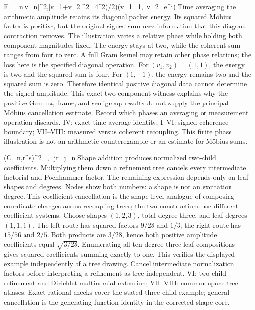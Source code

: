 {E=\sum_n|v_n|^2,\qquad |v_1+v_2|^2=4\cos^2(\theta/2)\quad(v_1=1,\ v_2=e^{i\theta})}
{Time averaging the arithmetic amplitude retains its diagonal packet energy. Its squared M\"obius factor is positive, but the original signed sum uses information that this diagonal contraction removes. The illustration varies a relative phase while holding both component magnitudes fixed. The energy stays at two, while the coherent sum ranges from four to zero. A full Gram kernel may retain other phase relations; the loss here is the specified diagonal operation.}
{For $(v_1,v_2)=(1,1)$, the energy is two and the squared sum is four. For $(1,-1)$, the energy remains two and the squared sum is zero. Therefore identical positive diagonal data cannot determine the signed amplitude. This exact two-component witness explains why the positive Gamma, frame, and semigroup results do not supply the principal M\"obius cancellation estimate.}
{Record which phases an averaging or measurement operation discards.}
{IV: exact time-average identity; I--VI: signed-coherence boundary; VII--VIII: measured versus coherent recoupling. This finite phase illustration is not an arithmetic counterexample or an estimate for M\"obius sums.}

{\left(C_{n,\mathbf r}^{\mathbf s}\right)^2=,\qquad \sum_jr_j=n}
{Shape addition produces normalized two-child coefficients. Multiplying them down a refinement tree cancels every intermediate factorial and Pochhammer factor. The remaining expression depends only on leaf shapes and degrees. Nodes show both numbers: a shape is not an excitation degree. This coefficient cancellation is the shape-level analogue of composing coordinate changes across recoupling trees; the two constructions use different coefficient systems.}
{Choose shapes $(1,2,3)$, total degree three, and leaf degrees $(1,1,1)$. The left route has squared factors $9/28$ and $1/3$; the right route has $15/56$ and $2/5$. Both products are $3/28$, hence both positive amplitude coefficients equal $\sqrt{3/28}$. Enumerating all ten degree-three leaf compositions gives squared coefficients summing exactly to one. This verifies the displayed example independently of a tree drawing.}
{Cancel intermediate normalization factors before interpreting a refinement as tree independent.}
{VI: two-child refinement and Dirichlet-multinomial extension; VII--VIII: common-space tree atlases. Exact rational checks cover the stated three-child example; general cancellation is the generating-function identity in the corrected shape core.}


